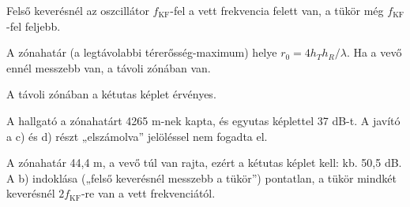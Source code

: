 Felső keverésnél az oszcillátor $f_\mathrm{KF}$-fel a vett frekvencia felett van, a tükör még $f_\mathrm{KF}$-fel feljebb.

\begin{center}\end{center}

A zónahatár (a legtávolabbi térerősség-maximum) helye $r_0=4h_Th_R/\lambda$. Ha a vevő ennél messzebb van, a távoli zónában van.

\begin{center}\end{center}

\begin{center}\end{center}

A távoli zónában a kétutas képlet érvényes.

\begin{center}\end{center}
\begin{tipp}
A hallgató a zónahatárt 4265 m-nek kapta, és egyutas képlettel 37 dB-t. A javító a c) és d) részt „elszámolva” jelöléssel nem fogadta el.
\end{tipp}
\begin{figyelem}[Javítás]
A zónahatár 44,4 m, a vevő túl van rajta, ezért a kétutas képlet kell: kb. 50,5 dB. A b) indoklása („felső keverésnél messzebb a tükör”) pontatlan, a tükör mindkét keverésnél $2f_\mathrm{KF}$-re van a vett frekvenciától.
\end{figyelem}
\begin{eredmeny}

\begin{center}\end{center}
\end{eredmeny}


